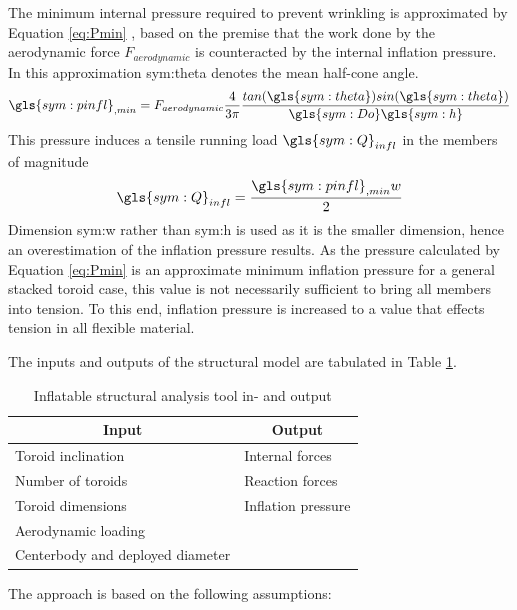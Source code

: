 The minimum internal pressure required to prevent wrinkling is approximated by Equation \ref{eq:Pmin} \cite{Brown2009, Samareh2011}, based on the premise that the work done by the aerodynamic force $F_{aerodynamic}$ is counteracted by the internal inflation pressure. In this approximation \gls{sym:theta} denotes the mean half-cone angle.
\begin{equation}
\label{eq:Pmin}
\gls{sym:pinfl}_{,min} = F_{aerodynamic} \frac{4}{3 \pi} \frac{tan(\gls{sym:theta})sin(\gls{sym:theta}) }{\gls{sym:Do}\gls{sym:h}}
\end{equation}
This pressure induces a tensile running load $\gls{sym:Q}_{infl}$ in the members of magnitude \cite{Megson2012}
\begin{equation}
\label{eq:Q}
\gls{sym:Q}_{infl} =\frac{\gls{sym:pinfl}_{,min}w}{2}
\end{equation}
Dimension \gls{sym:w} rather than \gls{sym:h} is used as it is the smaller dimension, hence an overestimation of the inflation pressure results. As the pressure calculated by Equation \ref{eq:Pmin} is an approximate minimum inflation pressure for a general stacked toroid case, this value is not necessarily sufficient to bring all members into tension. To this end, inflation pressure is increased to a value that effects tension in all flexible material.

The inputs and outputs of the structural model are tabulated in Table \ref{tab:infl}.
\begin{table}[h]
\caption{Inflatable structural analysis tool in- and output}
\centering
\begin{tabular}{|l||l|}
\hline
\multicolumn{1}{|c||}{{\bf Input}} & \multicolumn{1}{c|}{{\bf Output}} \\ \hline \hline
Toroid inclination                & Internal forces                   \\ \hline
Number of toroids                 & Reaction forces                   \\ \hline
Toroid dimensions                 & Inflation pressure                \\ \hline
Aerodynamic loading               &                                   \\ \hline
Centerbody and deployed diameter  &                                   \\ \hline
\end{tabular}
\label{tab:infl}
\end{table}

The approach is based on the following assumptions:

